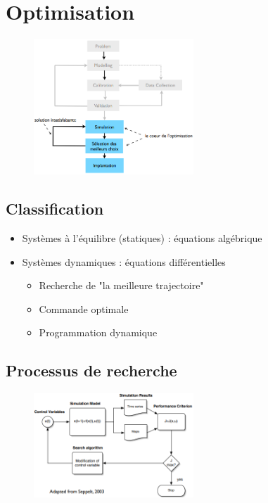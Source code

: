 \documentclass[resume]{subfiles}
\begin{document}
\section{Optimisation}
\begin{figure}[H]
\centering
\includegraphics[width=6cm]{img_20.png}
\end{figure}
\subsection{Classification}
\begin{itemize}
\item Systèmes à l'équilibre (statiques) : équations algébrique
\item Systèmes dynamiques : équations différentielles
\begin{itemize}
\item Recherche de "la meilleure trajectoire"
\item Commande optimale
\item Programmation dynamique
\end{itemize}
\end{itemize}
\subsection{Processus de recherche}
\begin{figure}[H]
\centering
\includegraphics[width=6cm]{img_21.png}
\end{figure}
\end{document}
